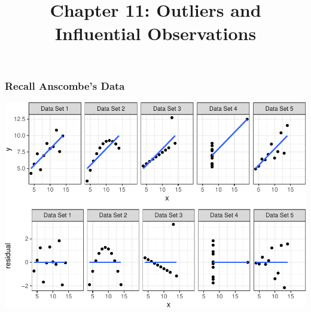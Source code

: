 \documentclass[]{extarticle}
\title{Chapter 11: Outliers and Influential Observations}
\author{}
\date{}
\begin{document}
\maketitle

\subsubsection{Recall Anscombe's Data}\label{recall-anscombes-data}

\includegraphics{20190417_residual_diagnostics_files/figure-latex/unnamed-chunk-1-1.pdf}
\end{document}
